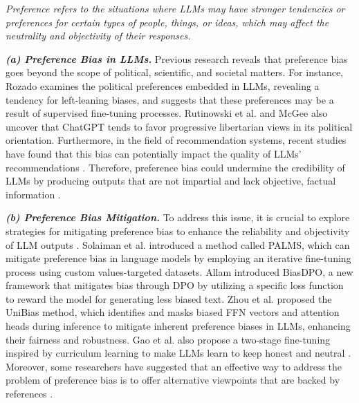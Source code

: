 \begin{tcolorbox}[definition]
\textit{Preference refers to the situations where LLMs may have stronger tendencies or preferences for certain types of people, things, or ideas, which may affect the neutrality and objectivity of their responses.}
\end{tcolorbox}

\textbf{\textit{(a) Preference Bias in LLMs.}} Previous research \cite{liu2023trustworthy} reveals that preference bias goes beyond the scope of political, scientific, and societal matters. For instance, Rozado \cite{rozado2024political} examines the political preferences embedded in LLMs, revealing a tendency for left-leaning biases, and suggests that these preferences may be a result of supervised fine-tuning processes. Rutinowski et al. \cite{rutinowski2024self} and McGee \cite{chatgptpolitical2} also uncover that ChatGPT tends to favor progressive libertarian views in its political orientation. Furthermore, in the field of recommendation systems, recent studies have found that this bias can potentially impact the quality of LLMs' recommendations \cite{recommend1, recommend2, recommend3}. Therefore, preference bias could undermine the credibility of LLMs by producing outputs that are not impartial and lack objective, factual information \cite{lin2024biasindetection}.

\textbf{\textit{(b) Preference Bias Mitigation.}} To address this issue, it is crucial to explore strategies for mitigating preference bias to enhance the reliability and objectivity of LLM outputs \cite{liu2023trustworthy}. 
Solaiman et al. \cite{solaiman2021palm} introduced a method called PALMS, which can mitigate preference bias in language models by employing an iterative fine-tuning process using custom values-targeted datasets. Allam \cite{allam2024biasdpo} introduced BiasDPO, a new framework that mitigates bias through DPO by utilizing a specific loss function to reward the model for generating less biased text. Zhou et al. \cite{zhou2024unibias} proposed the UniBias method, which identifies and masks biased FFN vectors and attention heads during inference to mitigate inherent preference biases in LLMs, enhancing their fairness and robustness. Gao et al. also propose a two-stage fine-tuning inspired by curriculum learning to make LLMs learn to keep honest and neutral \cite{gao2024best}. Moreover, some researchers have suggested that an effective way to address the problem of preference bias is to offer alternative viewpoints that are backed by references \cite{liu2023trustworthy, lewis2020retrieval}.


